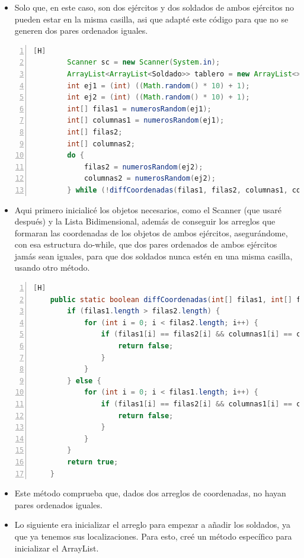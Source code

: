 \documentclass{article}
\begin{document}
	\begin{itemize}	
		\item Solo que, en este caso, son dos ejércitos y dos soldados de ambos ejércitos no pueden estar en la misma casilla, asi que adapté este código para que no se generen dos pares ordenados iguales.
	\end{itemize}
	\begin{lstlisting}[language=java,caption={Método main}, numbers=left][H]
		Scanner sc = new Scanner(System.in);
        ArrayList<ArrayList<Soldado>> tablero = new ArrayList<>(10);
        int ej1 = (int) ((Math.random() * 10) + 1);
        int ej2 = (int) ((Math.random() * 10) + 1);
        int[] filas1 = numerosRandom(ej1);
        int[] columnas1 = numerosRandom(ej1);
        int[] filas2;
        int[] columnas2;
        do {
            filas2 = numerosRandom(ej2);
            columnas2 = numerosRandom(ej2);
        } while (!diffCoordenadas(filas1, filas2, columnas1, columnas2));
	\end{lstlisting}
	\begin{itemize}	
		\item Aqui primero inicialicé los objetos necesarios, como el Scanner (que usaré después) y la Lista Bidimensional, además de conseguir los arreglos que formaran las coordenadas de los objetos de ambos ejércitos, asegurándome, con esa estructura do-while, que dos pares ordenados de ambos ejércitos jamás sean iguales, para que dos soldados nunca estén en una misma casilla, usando otro método.
	\end{itemize}
	\begin{lstlisting}[language=java,caption={Coordenadas diferentes}, numbers=left][H]
	public static boolean diffCoordenadas(int[] filas1, int[] filas2, int[] columnas1, int[] columnas2) {
        if (filas1.length > filas2.length) {
            for (int i = 0; i < filas2.length; i++) {
                if (filas1[i] == filas2[i] && columnas1[i] == columnas2[i]) {
                    return false;
                }
            }
        } else {
            for (int i = 0; i < filas1.length; i++) {
                if (filas1[i] == filas2[i] && columnas1[i] == columnas2[i]) {
                    return false;
                }
            }
        }
        return true;
    }
	\end{lstlisting}	
	\begin{itemize}	
		\item Este método comprueba que, dados dos arreglos de coordenadas, no hayan pares ordenados iguales.
		\item Lo siguiente era inicializar el arreglo para empezar a añadir los soldados, ya que ya tenemos sus localizaciones. Para esto, creé un método específico para inicializar el ArrayList.
	\end{itemize}
\end{document}
